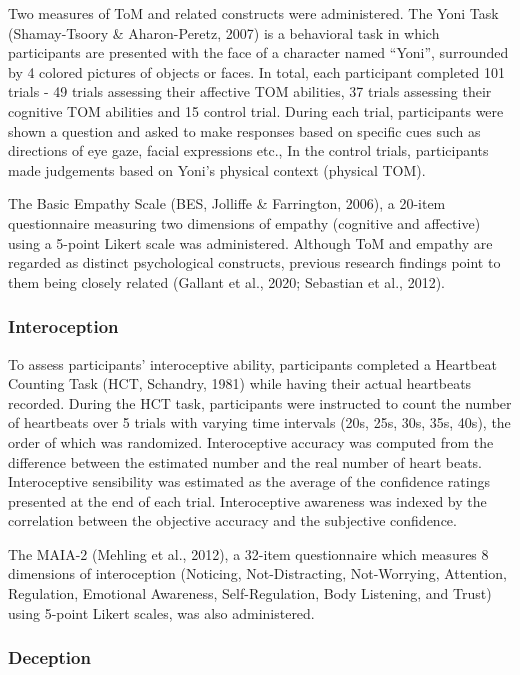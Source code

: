 \documentclass[
  man,floatsintext]{apa6}
\begin{document}
Two measures of ToM and related constructs were administered. The Yoni Task (Shamay-Tsoory \& Aharon-Peretz, 2007) is a behavioral task in which participants are presented with the face of a character named ``Yoni'', surrounded by 4 colored pictures of objects or faces. In total, each participant completed 101 trials - 49 trials assessing their affective TOM abilities, 37 trials assessing their cognitive TOM abilities and 15 control trial. During each trial, participants were shown a question and asked to make responses based on specific cues such as directions of eye gaze, facial expressions etc., In the control trials, participants made judgements based on Yoni's physical context (physical TOM).

The Basic Empathy Scale (BES, Jolliffe \& Farrington, 2006), a 20-item questionnaire measuring two dimensions of empathy (cognitive and affective) using a 5-point Likert scale was administered. Although ToM and empathy are regarded as distinct psychological constructs, previous research findings point to them being closely related (Gallant et al., 2020; Sebastian et al., 2012).

\hypertarget{interoception}{%
\subsubsection{Interoception}\label{interoception}}

To assess participants' interoceptive ability, participants completed a Heartbeat Counting Task (HCT, Schandry, 1981) while having their actual heartbeats recorded. During the HCT task, participants were instructed to count the number of heartbeats over 5 trials with varying time intervals (20s, 25s, 30s, 35s, 40s), the order of which was randomized. Interoceptive accuracy was computed from the difference between the estimated number and the real number of heart beats. Interoceptive sensibility was estimated as the average of the confidence ratings presented at the end of each trial. Interoceptive awareness was indexed by the correlation between the objective accuracy and the subjective confidence.

The MAIA-2 (Mehling et al., 2012), a 32-item questionnaire which measures 8 dimensions of interoception (Noticing, Not-Distracting, Not-Worrying, Attention, Regulation, Emotional Awareness, Self-Regulation, Body Listening, and Trust) using 5-point Likert scales, was also administered.

\hypertarget{deception}{%
\subsubsection{Deception}\label{deception}}
\end{document}
